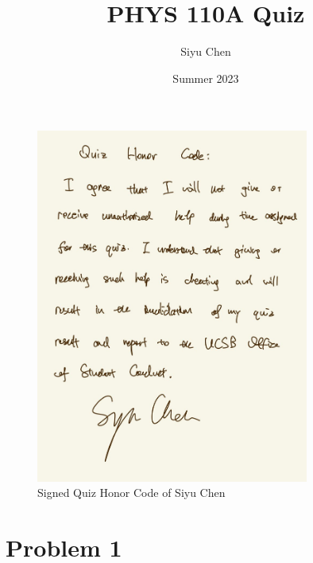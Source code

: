 \documentclass{article}
\title{PHYS 110A Quiz}
\author{Siyu Chen}
\date{Summer 2023}
\numberwithin{equation}{section}
\begin{document}
\maketitle

\begin{figure}[h]
\centering
\includegraphics[width=0.8\textwidth]{quizzes/quiz honor code.jpg}
\caption{Signed Quiz Honor Code of Siyu Chen}
\end{figure}

\section{Problem 1}
\end{document}
